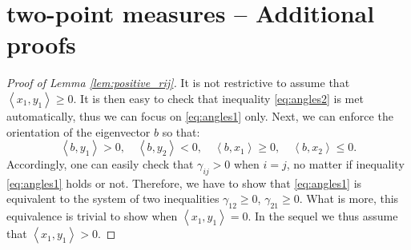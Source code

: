 \documentclass[11pt,letterpaper,reqno]{amsart}
\theoremstyle{definition}
\numberwithin{equation}{section}
\newcommand{\pairing}[1]{{\left \langle #1 \right \rangle}}
\begin{document}
{\section{two-point measures -- Additional proofs}
\label{app:examples}

\begin{proof}[Proof of Lemma \ref{lem:positive_rij}]
	It is not restrictive to assume that $\pairing{x_1,y_1} \geq 0$. It is then easy to check that inequality \eqref{eq:angles2} is met automatically, thus we can focus on \eqref{eq:angles1} only. Next, we can enforce the orientation of the eigenvector $b$ so that:
	\begin{equation}
		\label{eq:ny1}
		\pairing{b,y_1} > 0, \quad \pairing{b,y_2} < 0, \quad \pairing{b,x_1} \geq 0, \quad \pairing{b,x_2} \leq 0.
	\end{equation}
	Accordingly, one can easily check that $\gamma_{ij} >0$ when $i = j$, no matter if inequality \eqref{eq:angles1} holds or not. Therefore, we have to show that \eqref{eq:angles1} is equivalent to the system of two inequalities $\gamma_{12}\geq0$, $\gamma_{21}\geq 0$. What is more, this equivalence is trivial to show when $\pairing{x_1,y_1} = 0$. In the sequel we thus assume that $\pairing{x_1,y_1}>0$.
	

\end{proof}}
\end{document}
